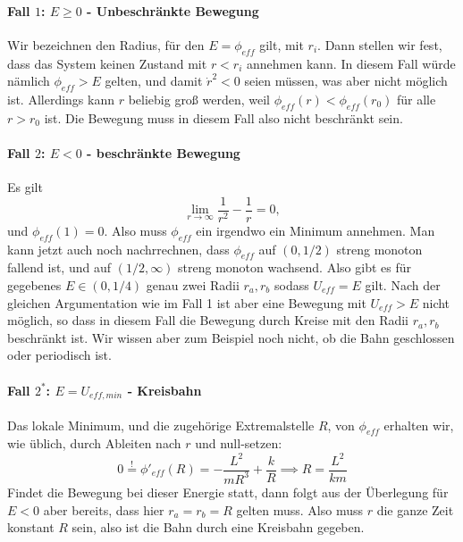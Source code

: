 \paragraph*{Fall $1$: $E\geq 0$ - Unbeschränkte Bewegung}
Wir bezeichnen den Radius, für den $E=\phi_{eff}$ gilt, mit $r_i$. Dann stellen wir fest, dass das System keinen Zustand mit $r<r_i$ annehmen kann. In diesem Fall würde nämlich $\phi_{eff}>E$ gelten, und damit $\dot{r}^2<0$ seien müssen, was aber nicht möglich ist. Allerdings kann $r$ beliebig groß werden, weil $\phi_{eff}(r)<\phi_{eff}(r_0)$ für alle $r>r_0$ ist. Die Bewegung muss in diesem Fall also nicht beschränkt sein.
\paragraph*{Fall $2$: $E <0$ - beschränkte Bewegung}
Es gilt
\[
\lim_{r\to \infty} \frac{1}{r^2} - \frac{1}{r} = 0,
\]
und $\phi_{eff}(1) =0$. Also muss $\phi_{eff}$ ein irgendwo ein Minimum annehmen. Man kann jetzt auch noch nachrrechnen, dass $\phi_{eff}$ auf $(0,1/2)$ streng monoton fallend ist, und auf $(1/2,\infty)$ streng monoton wachsend. Also gibt es für gegebenes $E\in (0,1/4)$ genau zwei Radii $r_a,r_b$ sodass $U_{eff}=E$ gilt. Nach der gleichen Argumentation wie im Fall 1 ist aber eine Bewegung mit $U_{eff}>E$ nicht möglich, so dass in diesem Fall die Bewegung durch Kreise mit den Radii $r_a,r_b$ beschränkt ist. Wir wissen aber zum Beispiel noch nicht, ob die Bahn geschlossen oder periodisch ist.
\paragraph*{Fall $2^\ast$: $E=U_{eff,min}$ - Kreisbahn}
Das lokale Minimum, und die zugehörige Extremalstelle $R$, von $\phi_{eff}$ erhalten wir, wie üblich, durch Ableiten nach $r$ und null-setzen:
\[
0\overset{!}{=}\phi'_{eff}(R) = -\frac{L^2}{mR^3}+\frac{k}{R} \implies R = \frac{L^2}{km}
\]
Findet die Bewegung bei dieser Energie statt, dann folgt aus der Überlegung für $E<0$ aber bereits, dass hier $r_a=r_b=R$ gelten muss. Also muss $r$ die ganze Zeit konstant $R$ sein, also ist die Bahn durch eine Kreisbahn gegeben.
